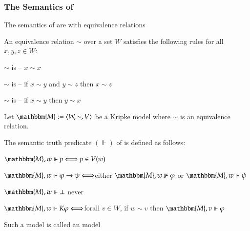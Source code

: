 \begin{frame}[allowframebreaks]
\frametitle{The Semantics of }
\begin{itemizedot}
  \item The semantics of  are  with
  equivalence relations
  
  \item An equivalence relation $\sim$ over a set $W$ satisfies the following
  rules for all $x, y, z \in W$:
  \begin{itemizedot}
    \item $\sim$ is {} -- $x \sim x$
    
    \item $\sim$ is {} -- if $x \sim y$ and $y \sim z$ then
    $x \sim z$
    
    \item $\sim$ is  -- if $x \sim y$ then $y \sim x$
  \end{itemizedot}
\end{itemizedot}
\framebreak
\begin{itemizedot}
  \item Let $\mathbbm{M} \assign \langle W, \sim, V \rangle$ be a Kripke model
  where $\sim$ is an equivalence relation.
  
  \item The semantic truth predicate $(\Vdash)$ of  is defined as
  follows:
  \begin{itemizedot}
    \item $\mathbbm{M}, w \Vdash p \Longleftrightarrow p \in V (w)$
    
    \item $\mathbbm{M}, w \Vdash \phi \rightarrow \psi
    \Longleftrightarrow$either $\mathbbm{M}, w \nVdash \phi$ or $\mathbbm{M},
    w \Vdash \psi$
    
    \item $\mathbbm{M}, w \Vdash \bot$ never
    
    \item $\mathbbm{M}, w \Vdash K \phi \Longleftrightarrow$forall $v \in W$,
    if $w \sim v$ then $\mathbbm{M}, v \Vdash \phi$
  \end{itemizedot}
  \item Such a model is called an  model
\end{itemizedot}
\end{frame}

